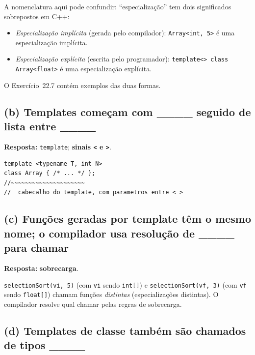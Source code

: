 \documentclass[11pt,a4paper]{article}
\begin{document}
\begin{obseng}
A nomenclatura aqui pode confundir: ``especializa\c{c}\~ao'' tem dois significados sobrepostos em C++:
\begin{itemize}[leftmargin=*,itemsep=0pt]
  \item \emph{Especializa\c{c}\~ao impl\'icita} (gerada pelo compilador): \texttt{Array<int, 5>} \'e uma especializa\c{c}\~ao impl\'icita.
  \item \emph{Especializa\c{c}\~ao expl\'icita} (escrita pelo programador): \texttt{template<> class Array<float>} \'e uma especializa\c{c}\~ao expl\'icita.
\end{itemize}
O Exerc\'icio~22.7 cont\'em exemplos das duas formas.
\end{obseng}

\subsection*{(b) Templates come\c{c}am com \_\_\_\_ seguido de lista entre \_\_\_\_}

\begin{resposta}\textbf{Resposta:} \texttt{template}; \textbf{sinais \texttt{<} e \texttt{>}}.\end{resposta}

\begin{lstlisting}[style=cppcode,numbers=none]
template <typename T, int N>
class Array { /* ... */ };
//~~~~~~~~~~~~~~~~~~~~~
//  cabecalho do template, com parametros entre < >
\end{lstlisting}

\subsection*{(c) Fun\c{c}\~oes geradas por template t\^em o mesmo nome; o compilador usa resolu\c{c}\~ao de \_\_\_\_ para chamar}

\begin{resposta}\textbf{Resposta:} \textbf{sobrecarga}.\end{resposta}

\texttt{selectionSort(vi, 5)} (com \texttt{vi} sendo \texttt{int[]}) e \texttt{selectionSort(vf, 3)} (com \texttt{vf} sendo \texttt{float[]}) chamam fun\c{c}\~oes \emph{distintas} (especializa\c{c}\~oes distintas). O compilador resolve qual chamar pelas regras de sobrecarga.

\subsection*{(d) Templates de classe tamb\'em s\~ao chamados de tipos \_\_\_\_}
\end{document}
